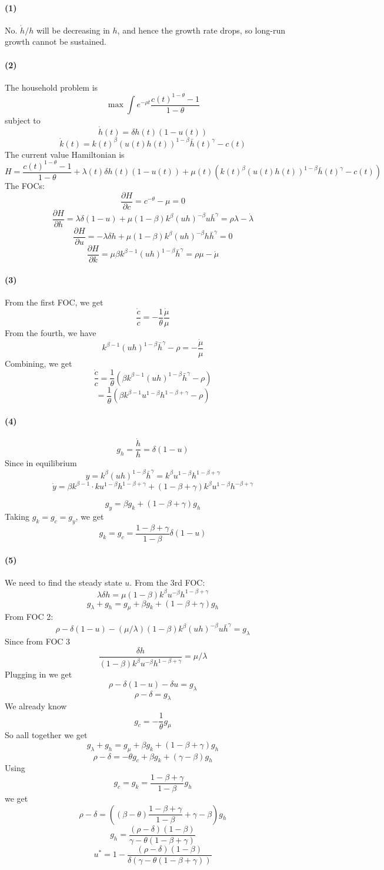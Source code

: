 \documentclass[10pt,letter]{article}
\newcommand{\problempart}[1]{\paragraph{#1}}
\begin{document}
\problempart{(1)}
No. $\dot{h}/h$ will be decreasing in $h$, and hence the growth rate drops, so long-run growth cannot be sustained.
\problempart{(2)}
The household problem is
\[ \max \int e^{-\rho t} \frac{c(t)^{1-\theta} - 1}{1-\theta} \]
subject to
\[ \dot{h}(t) = \delta h(t)(1-u(t)) \]
\[ \dot{k}(t) = k(t)^\beta (u(t)h(t))^{1-\beta}\bar{h}(t)^\gamma - c(t) \]
The current value Hamiltonian is
\[ H = \frac{c(t)^{1-\theta} - 1}{1-\theta} + \lambda(t)\delta h(t)(1-u(t)) + \mu(t) (k(t)^\beta (u(t)h(t))^{1-\beta}\bar{h}(t)^\gamma - c(t)) \]
The FOCs:
\[ \frac{\partial H}{\partial c} = c^{-\theta} - \mu = 0 \]
\[ \frac{\partial H}{\partial h} = \lambda \delta (1-u) + \mu (1-\beta) k^\beta (uh)^{-\beta}u\bar{h}^\gamma = \rho \lambda - \dot{\lambda} \]
\[ \frac{\partial H}{\partial u} = - \lambda \delta h + \mu (1-\beta)k^\beta (uh)^{-\beta}h \bar{h}^\gamma = 0  \]
\[ \frac{\partial H}{\partial k} = \mu \beta k^{\beta - 1}(u h )^{1-\beta}\bar{h}^\gamma = \rho \mu - \dot{\mu} \]
\problempart{(3)}
From the first FOC, we get
\[ \frac{\dot{c}}{c}= -\frac{1}{\theta} \frac{\dot{\mu}}{\mu} \]
From the fourth, we have
\[ k^{\beta - 1}(u h )^{1-\beta}\bar{h}^\gamma - \rho = - \frac{\dot{\mu}}{\mu} \]
Combining, we get
\[ \frac{\dot{c}}{c}= \frac{1}{\theta} \left( \beta k^{\beta - 1}(u h )^{1-\beta}\bar{h}^\gamma - \rho  \right) \]
\[ = \frac{1}{\theta} \left( \beta k^{\beta - 1}u^{1-\beta}h^{1-\beta+\gamma} - \rho  \right)  \]

\problempart{(4)}
\[ g_h = \frac{\dot{h}}{h} = \delta (1-u) \]
Since in equilibrium
\[ y = k^\beta (uh)^{1-\beta}\bar{h}^\gamma = k^\beta u^{1-\beta}h^{1-\beta + \gamma}\]
\[ \dot{y} = \beta k^{\beta - 1}\cdot{k} u^{1-\beta}h^{1-\beta + \gamma} + (1-\beta + \gamma )k^\beta u^{1-\beta}h^{-\beta + \gamma} \]

\[ g_y = \beta g_k  + (1-\beta + \gamma )g_h \]
Taking $g_k = g_c = g_y$, we get
\[ g_k = g_c = \frac{1-\beta + \gamma}{1-\beta}\delta (1-u) \]
\problempart{(5)}
We need to find the steady state $u$. From the 3rd FOC:
\[ \lambda \delta h = \mu (1-\beta)k^\beta u^{-\beta}h^{1 - \beta + \gamma}  \]
\[ g_\lambda + g_h = g_\mu + \beta g_k + (1-\beta+\gamma) g_h  \]
From FOC 2:
\[  \rho - \delta (1-u) - (\mu/\lambda) (1-\beta) k^\beta (uh)^{-\beta}u\bar{h}^\gamma = g_\lambda \]
Since from FOC 3
\[ \frac{\delta h}{(1-\beta)k^\beta u^{-\beta}h^{1 - \beta + \gamma}} = \mu/\lambda   \]
Plugging in we get
\[  \rho - \delta (1-u) - \delta u = g_\lambda \]
\[  \rho - \delta  = g_\lambda \]
We already know
\[ g_c = -\frac{1}{\theta} g_\mu \]
So aall together we get
\[ g_\lambda + g_h = g_\mu + \beta g_k + (1-\beta+\gamma) g_h  \]
\[ \rho - \delta   = - \theta g_c + \beta g_k + (\gamma - \beta) g_h  \]
Using
\[ g_c = g_k = \frac{1-\beta + \gamma}{1-\beta} g_h \]
we get
\[ \rho - \delta   =  \left( (\beta - \theta)\frac{1-\beta + \gamma}{1-\beta} + \gamma - \beta \right)  g_h  \]
\[ g_h  =  \frac{(\rho - \delta )(1-\beta)}{ \gamma - \theta(1-\beta + \gamma) }    \]
\[ u^* = 1 - \frac{(\rho - \delta )(1-\beta)}{ \delta (\gamma - \theta(1-\beta + \gamma) )}  \]
\end{document}
